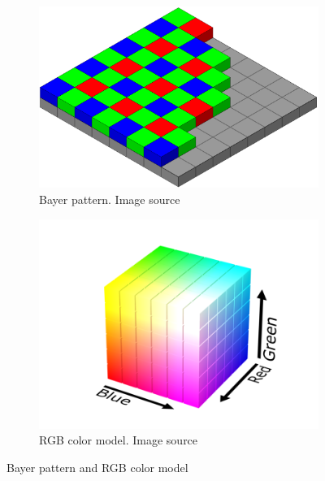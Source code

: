 \documentclass{ctuthesis}
\begin{document}
\begin{figure}[htbp]
     \centering
     \begin{subfigure}{0.475\textwidth}
         \centering
         \includegraphics[width=\textwidth]{Bayer_pattern_on_sensor.svg.png}
         \caption{Bayer pattern. Image source\cite{bayerpattern}}
         \label{fig:2-2-a}
     \end{subfigure}
     \hfill
     \begin{subfigure}{0.475\textwidth}
         \centering
         \includegraphics[width=\textwidth]{RGB_color_solid_cube.png}
         \caption{RGB color model. Image source\cite{rgbcolormodel}}
         \label{fig 2-2-b}
     \end{subfigure}

        \caption{Bayer pattern and RGB color model}
        \label{fig: 2-2}
\end{figure}
\end{document}
